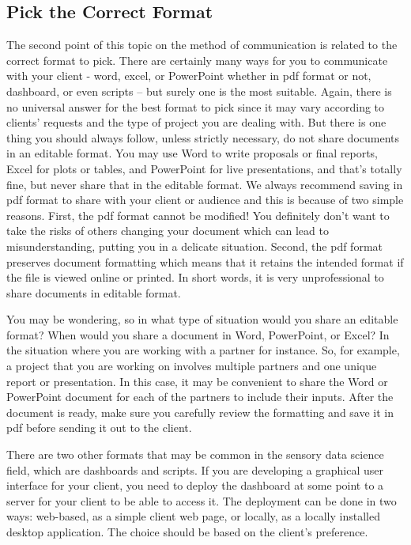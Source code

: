 \documentclass[
]{krantz}
\begin{document}
\hypertarget{pick-the-correct-format}{%
\subsection{Pick the Correct Format}\label{pick-the-correct-format}}

The second point of this topic on the method of communication is related to the correct format to pick. There are certainly many ways for you to communicate with your client - word, excel, or PowerPoint whether in pdf format or not, dashboard, or even scripts -- but surely one is the most suitable. Again, there is no universal answer for the best format to pick since it may vary according to clients' requests and the type of project you are dealing with. But there is one thing you should always follow, unless strictly necessary, do not share documents in an editable format. You may use Word to write proposals or final reports, Excel for plots or tables, and PowerPoint for live presentations, and that's totally fine, but never share that in the editable format. We always recommend saving in pdf format to share with your client or audience and this is because of two simple reasons. First, the pdf format cannot be modified! You definitely don't want to take the risks of others changing your document which can lead to misunderstanding, putting you in a delicate situation. Second, the pdf format preserves document formatting which means that it retains the intended format if the file is viewed online or printed. In short words, it is very unprofessional to share documents in editable format.

You may be wondering, so in what type of situation would you share an editable format? When would you share a document in Word, PowerPoint, or Excel? In the situation where you are working with a partner for instance. So, for example, a project that you are working on involves multiple partners and one unique report or presentation. In this case, it may be convenient to share the Word or PowerPoint document for each of the partners to include their inputs. After the document is ready, make sure you carefully review the formatting and save it in pdf before sending it out to the client.

There are two other formats that may be common in the sensory data science field, which are dashboards and scripts. If you are developing a graphical user interface for your client, you need to deploy the dashboard at some point to a server for your client to be able to access it. The deployment can be done in two ways: web-based, as a simple client web page, or locally, as a locally installed desktop application. The choice should be based on the client's preference.
\end{document}
